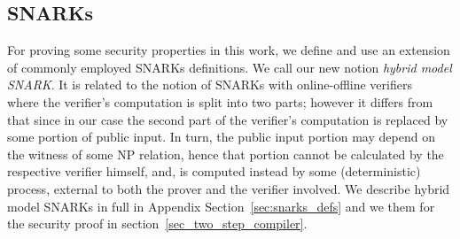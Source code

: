 \subsection{SNARKs}
\label{sec:short_snarks_defs}
\noindent For proving some security properties in this work, we define and use an extension of commonly employed SNARKs definitions. We call our new notion \emph{hybrid model SNARK}. It is related to the notion of SNARKs with online-offline verifiers~\cite{HP_paper} where the verifier's computation 
is split into two parts; however it differs from that since in our case the second part of the verifier's computation is replaced by some portion of public input. 
In turn, the public input portion may depend on the witness of some NP relation, hence that portion cannot be calculated by the respective verifier himself, and, is computed instead by some (deterministic) process, external to both the prover and the verifier involved. We describe hybrid model SNARKs in full in Appendix Section~\ref{sec:snarks_defs} and we them for the security proof in section~\ref{sec_two_step_compiler}.




